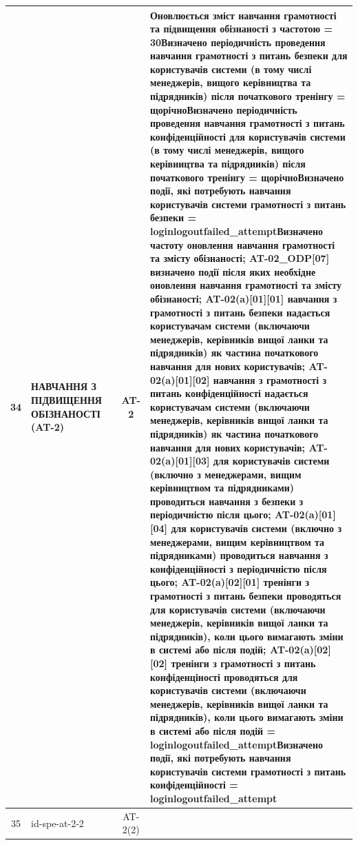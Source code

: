 \documentclass[10pt]{article}
\begin{document}
\begin{longtable}{|c|>{\raggedright\arraybackslash}p{2.5cm}|>{\raggedright\arraybackslash}p{4.5cm}|c|>{\raggedright\arraybackslash}p{4.5cm}|}
34 & НАВЧАННЯ З ПІДВИЩЕННЯ ОБІЗНАНОСТІ (AT-2) &  & AT-2 & Оновлюється зміст навчання грамотності та підвищення обізнаності з частотою = \textbf{30}\newline Визначено періодичність проведення навчання грамотності з питань безпеки для користувачів системи (в тому числі менеджерів, вищого керівництва та підрядників) після початкового тренінгу = \textbf{щорічно}\newline Визначено періодичність проведення навчання грамотності з питань конфіденційності для користувачів системи (в тому числі менеджерів, вищого керівництва та підрядників) після початкового тренінгу = \textbf{щорічно}\newline Визначено події, які потребують навчання користувачів системи грамотності з питань безпеки = \textbf{loginlogoutfailed\_\allowbreak{}attempt}\newline Визначено частоту оновлення навчання грамотності та змісту обізнаності; AT-02\_\allowbreak{}ODP[07] визначено події після яких необхідне оновлення навчання грамотності та змісту обізнаності; AT-02(a)[01][01] навчання з грамотності з питань безпеки надається користувачам системи (включаючи менеджерів, керівників вищої ланки та підрядників) як частина початкового навчання для нових користувачів; AT-02(a)[01][02] навчання з грамотності з питань конфіденційності надається користувачам системи (включаючи менеджерів, керівників вищої ланки та підрядників) як частина початкового навчання для нових користувачів; AT-02(a)[01][03] для користувачів системи (включно з менеджерами, вищим керівництвом та підрядниками) проводиться навчання з безпеки з періодичністю після цього; AT-02(a)[01][04] для користувачів системи (включно з менеджерами, вищим керівництвом та підрядниками) проводиться навчання з конфіденційності з періодичністю після цього; AT-02(a)[02][01] тренінги з грамотності з питань безпеки проводяться для користувачів системи (включаючи менеджерів, керівників вищої ланки та підрядників), коли цього вимагають зміни в системі або після подій; AT-02(a)[02][02] тренінги з грамотності з питань конфіденціності проводяться для користувачів системи (включаючи менеджерів, керівників вищої ланки та підрядників), коли цього вимагають зміни в системі або після подій = \textbf{loginlogoutfailed\_\allowbreak{}attempt}\newline Визначено події, які потребують навчання користувачів системи грамотності з питань конфіденційності = \textbf{loginlogoutfailed\_\allowbreak{}attempt} \\ \hline
35 & id-spe-at-2-2 &  & AT-2(2) &  \\ \hline

\end{longtable}
\end{document}
